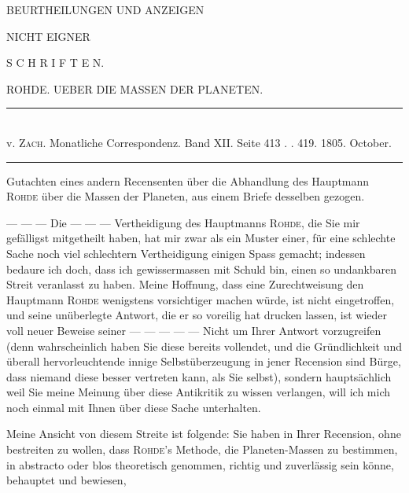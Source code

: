 \clearpage
\thispagestyle{empty}
\begin{center}
\vspace*{.22\textheight}
{\Large BEURTHEILUNGEN UND ANZEIGEN\par}
\vspace{14mm}
NICHT EIGNER\par
\vspace{14mm}
{\Large S C H R I F T E N.\par}
\end{center}
\clearpage
{}
\begin{center}
{\large ROHDE. UEBER DIE MASSEN DER PLANETEN.\par}
\medskip
\rule{0.55\linewidth}{0.4pt}\\[2pt]
v. \textsc{Zach}. Monatliche Correspondenz. Band XII. Seite 413 . . 419. 1805. October.\\[2pt]
\rule{0.55\linewidth}{0.4pt}
\end{center}
\begin{center}Gutachten eines andern Recensenten über die Abhandlung des Hauptmann \textsc{Rohde} über die Massen der Planeten, aus einem Briefe desselben gezogen.\end{center}

\noindent --- --- --- Die --- --- --- Vertheidigung des Hauptmanns \textsc{Rohde}, die Sie mir gefälligst mitgetheilt haben, hat mir zwar als ein Muster einer, für eine schlechte Sache noch viel schlechtern Vertheidigung einigen Spass gemacht; indessen bedaure ich doch, dass ich gewissermassen mit Schuld bin, einen so undankbaren Streit veranlasst zu haben. Meine Hoffnung, dass eine Zurechtweisung den Hauptmann \textsc{Rohde} wenigstens vorsichtiger machen würde, ist nicht eingetroffen, und seine unüberlegte Antwort, die er so voreilig hat drucken lassen, ist wieder voll neuer Beweise seiner --- --- --- --- --- Nicht um Ihrer Antwort vorzugreifen (denn wahrscheinlich haben Sie diese bereits vollendet, und die Gründlichkeit und überall hervorleuchtende innige Selbstüberzeugung in jener Recension sind Bürge, dass niemand diese besser vertreten kann, als Sie selbst), sondern hauptsächlich weil Sie meine Meinung über diese Antikritik zu wissen verlangen, will ich mich noch einmal mit Ihnen über diese Sache unterhalten.

Meine Ansicht von diesem Streite ist folgende: Sie haben in Ihrer Recension, ohne bestreiten zu wollen, dass \textsc{Rohde}'s Methode, die Planeten-Massen zu bestimmen, in abstracto oder blos theoretisch genommen, richtig und zuverlässig sein könne, behauptet und bewiesen,

